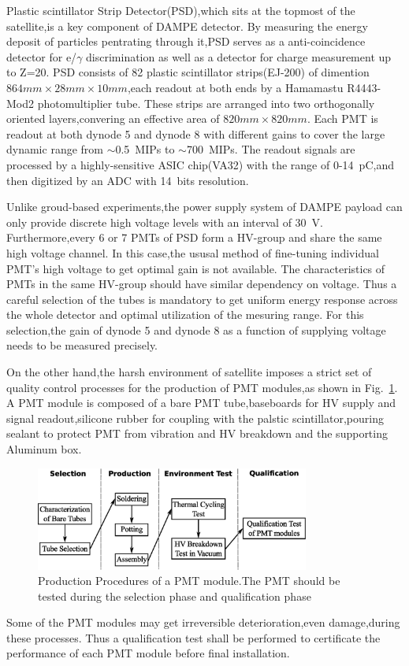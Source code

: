 \documentclass[preprint,3p,times]{elsarticle}
\begin{document}
Plastic scintillator Strip Detector(PSD),which sits at the topmost of the satellite,is a key component of DAMPE detector.
By measuring the energy deposit of particles pentrating through it,PSD serves as a anti-coincidence detector for e/$\gamma$ discrimination as well as a detector for charge measurement up to Z=20.
PSD consists of 82 plastic scintillator strips(EJ-200\cite{ej200}) of dimention $864mm\times28mm\times10mm$,each readout at both ends by a Hamamastu R4443-Mod2 photomultiplier tube.
These strips are arranged into two orthogonally oriented layers,convering an effective area of $820mm\times820mm$.
Each PMT is readout at both dynode 5 and dynode 8 with different gains to cover the large dynamic range from $\sim$0.5~MIPs to $\sim$700~MIPs.
The readout signals are processed by a highly-sensitive ASIC chip(VA32) with the range of 0-14~pC,and then digitized by an ADC with 14~bits resolution.

Unlike groud-based experiments,the power supply system of DAMPE payload can only provide discrete high voltage levels with an interval of 30~V.
Furthermore,every 6 or 7 PMTs of PSD form a HV-group and share the same high voltage channel.
In this case,the ususal method of fine-tuning individual PMT's high voltage to get optimal gain is not available.  
The characteristics of PMTs in the same HV-group should have similar dependency on voltage.
Thus a careful selection of the tubes is mandatory to get uniform energy response across the whole detector and optimal utilization of the mesuring range.
For this selection,the gain of dynode 5 and dynode 8 as a function of supplying voltage needs to be measured precisely.  

On the other hand,the harsh environment of satellite imposes a strict set of quality control processes for the production of PMT modules,as shown in Fig.~\ref{fig:production_procedure}.
A PMT module is composed of a bare PMT tube,baseboards for HV supply and signal readout,silicone rubber for coupling with the palstic scintillator,pouring sealant to protect PMT from vibration and HV breakdown and the supporting Aluminum box.
\begin{figure}[h!]
 \centering
 \includegraphics[width=90mm]{pmt_production_procedure}
\caption{Production Procedures of a PMT module.The PMT should be tested during the selection phase and qualification phase}
\label{fig:production_procedure}
\end{figure} 
Some of the PMT modules may get irreversible deterioration,even damage,during these processes.
Thus a qualification test shall be performed to certificate the performance of each PMT module before final installation. 
\end{document}

